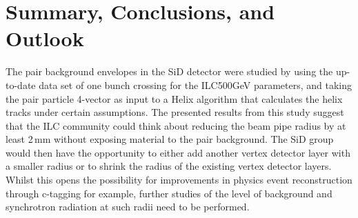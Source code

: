 \section{Summary, Conclusions, and Outlook}
The pair background envelopes in the SiD detector were studied by using the up-to-date \guineapig data set of one bunch crossing for the ILC500GeV parameters, and taking the pair particle 4-vector as input to a Helix algorithm that calculates the helix tracks under certain assumptions.
The presented results from this study suggest that the ILC community could think about reducing the beam pipe radius by at least \unit{2}\,{mm} without exposing material to the pair background.
The SiD group would then have the opportunity to either add another vertex detector layer with a smaller radius or to shrink the radius of the existing vertex detector layers.
Whilst this opens the possibility for improvements in physics event reconstruction through c-tagging for example, further studies of the level of background and synchrotron radiation at such
radii need to be performed.
